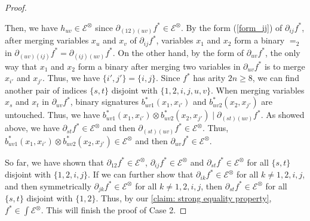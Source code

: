 \begin{proof}
\begin{itemize}
Then, we have $ {h_{uv}} \in {\mathcal{E}}^{\otimes}$ since ${\partial}_{(12)(uv)}{f^{\ast}} \in 
{\mathcal{E}}^{\otimes}$. 
By the form (\ref{form_ij}) of ${\partial}_{ij}{f^{\ast}}$, 
after merging variables $x_u$ and $x_v$ of  ${\partial}_{ij}{f^{\ast}}$,
variables $x_1$ and $x_2$ form a binary $=_2$ in ${\partial}_{(uv)(ij)}{f^{\ast}}={\partial}_{(ij)(uv)}{f^{\ast}}$. 
On the other hand,
by the form of ${\partial}_{uv}{f^{\ast}}$, the only way that $x_1$ and $x_2$  form a binary after merging two variables in ${\partial}_{uv}{f^{\ast}}$ is to merge  $x_{i'}$ and $x_{j'}$. 
Thus, we have $\{i', j'\}=\{i, j\}$. Since ${f^{\ast}}$ has arity $2n \geqslant 8$, we can find another pair of indices $\{s, t\}$ disjoint with $\{1, 2, i, j, u, v\}$. 
When merging variables $x_s$ and $x_t$ in ${\partial}_{uv}{f^{\ast}}$, 
binary signatures ${b^\ast_{uv1}}(x_1, x_{i'})$ and ${b^\ast_{uv2}}(x_2, x_{j'})$ are untouched. 
Thus, we have ${b^\ast_{uv1}}(x_1, x_{i'})\otimes {b^\ast_{uv2}}(x_2, x_{j'})\mid {\partial}_{(st)(uv)}{f^{\ast}}$.
As showed above, we have ${\partial}_{st}{f^{\ast}}\in {\mathcal{E}}^{\otimes}$ and then  ${\partial}_{(st)(uv)}{f^{\ast}}\in {\mathcal{E}}^{\otimes}$.
Thus, ${b^\ast_{uv1}}(x_1, x_{i'})\otimes {b^\ast_{uv2}}(x_2, x_{j'})\in {\mathcal{E}}^{\otimes}$ and then ${\partial}_{uv}{f^{\ast}}\in {\mathcal{E}}^{\otimes}$.
\end{itemize}

So far, we have shown that ${\partial}_{12}{f^{\ast}}\in {\mathcal{E}}^{\otimes}$, ${\partial}_{ij}{f^{\ast}}\in {\mathcal{E}}^{\otimes}$ and ${\partial}_{st}{f^{\ast}}\in {\mathcal{E}}^{\otimes}$ for all $\{s, t\}$ disjoint with $\{1, 2, i, j\}$.
If we can further show that ${\partial}_{ik}{f^{\ast}}\in {\mathcal{E}}^{\otimes}$ for all $k\neq 1, 2, i, j$, and then symmetrically ${\partial}_{jk}{f^{\ast}}\in {\mathcal{E}}^{\otimes}$ for all $k\neq 1, 2, i, j$, then 
${\partial}_{st}{f^{\ast}}\in {\mathcal{E}}^{\otimes}$ for all $\{s, t\}$  disjoint with $\{1, 2\}$.
Thus, by our \cref{claim: strong equality property},  ${f^\ast}\in {\int}\mathcal{E}^{\otimes}$. This will finish the proof of Case 2.


\end{proof}

